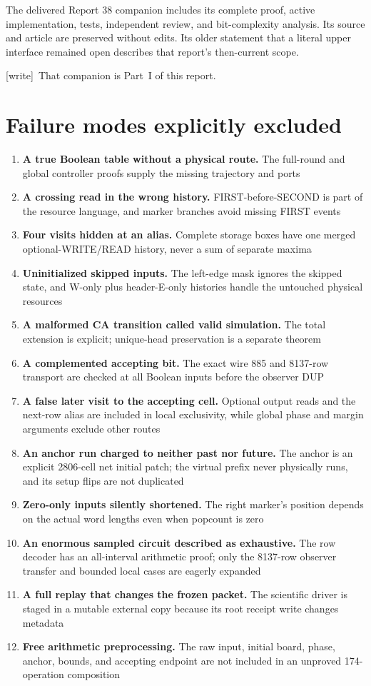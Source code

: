 \documentclass[11pt,letterpaper]{article}
\theoremstyle{definition}\newtheorem{definition}[theorem]{Definition}
\theoremstyle{remark}\newtheorem{remark}[theorem]{Remark}
\newcommand{\wtag}{\textup{[write]}}
\begin{document}
The delivered Report 38 companion includes its complete proof, active implementation, tests, independent review, and bit-complexity analysis. Its source and article are preserved without edits. Its older statement that a literal upper interface remained open describes that report's then-current scope.

{\small\wtag\ That companion is Part~I of this report.\par}

\section{Failure modes explicitly excluded}\label{ptr:la:app:failures}
\begin{enumerate}
\item \textbf{A true Boolean table without a physical route.} The full-round and global controller proofs supply the missing trajectory and ports
\item \textbf{A crossing read in the wrong history.} FIRST-before-SECOND is part of the resource language, and marker branches avoid missing FIRST events
\item \textbf{Four visits hidden at an alias.} Complete storage boxes have one merged optional-WRITE/READ history, never a sum of separate maxima
\item \textbf{Uninitialized skipped inputs.} The left-edge mask ignores the skipped state, and W-only plus header-E-only histories handle the untouched physical resources
\item \textbf{A malformed CA transition called valid simulation.} The total extension is explicit; unique-head preservation is a separate theorem
\item \textbf{A complemented accepting bit.} The exact wire 885 and 8137-row transport are checked at all Boolean inputs before the observer DUP
\item \textbf{A false later visit to the accepting cell.} Optional output reads and the next-row alias are included in local exclusivity, while global phase and margin arguments exclude other routes
\item \textbf{An anchor run charged to neither past nor future.} The anchor is an explicit 2806-cell net initial patch; the virtual prefix never physically runs, and its setup flips are not duplicated
\item \textbf{Zero-only inputs silently shortened.} The right marker's position depends on the actual word lengths even when popcount is zero
\item \textbf{An enormous sampled circuit described as exhaustive.} The row decoder has an all-interval arithmetic proof; only the 8137-row observer transfer and bounded local cases are eagerly expanded
\item \textbf{A full replay that changes the frozen packet.} The scientific driver is staged in a mutable external copy because its root receipt write changes metadata
\item \textbf{Free arithmetic preprocessing.} The raw input, initial board, phase, anchor, bounds, and accepting endpoint are not included in an unproved 174-operation composition
\end{enumerate}
\end{document}
